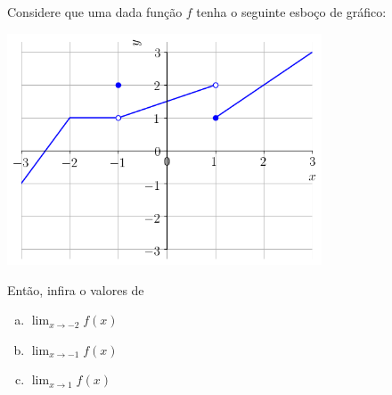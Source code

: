 \begin{exeresol}
  Considere que uma dada função $f$ tenha o seguinte esboço de gráfico:

  \begin{center}
    \includegraphics[width=0.7\textwidth]{./cap_lim/dados/fig_exeresol_nocaolim/fig_exeresol_nocaolim}
  \end{center}

  Então, infira o valores de
  \begin{enumerate}[a)]
  \item $\displaystyle \lim_{x\to -2} f(x)$
  \item $\displaystyle \lim_{x\to -1} f(x)$
  \item $\displaystyle \lim_{x\to 1} f(x)$
  \end{enumerate}
\end{exeresol}
